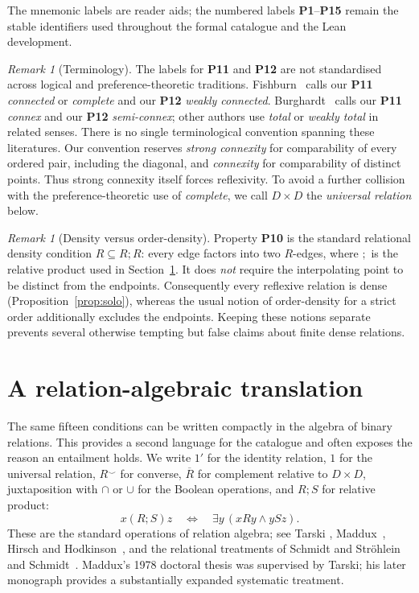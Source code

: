 \documentclass[11pt,a4paper,reqno]{amsart}
\theoremstyle{definition}
\theoremstyle{remark}
\newtheorem{remark}[proposition]{Remark}
\newcommand{\prop}[1]{\textbf{P#1}}
\newcommand{\comp}[1]{\overline{#1}}
\newcommand{\Id}{1'}
\newcommand{\Univ}{1}
\begin{document}
The mnemonic labels are reader aids; the numbered labels \prop{1}--\prop{15}
remain the stable identifiers used throughout the formal catalogue and the
Lean development.

\begin{remark}[Terminology]
The labels for \prop{11} and \prop{12} are not standardised across logical and
preference-theoretic traditions.  Fishburn~\cite[Ch.~1]{Fishburn1970} calls
our \prop{11} \emph{connected} or \emph{complete} and our \prop{12}
\emph{weakly connected}.  Burghardt~\cite{Burghardt2018} calls our \prop{11}
\emph{connex} and our \prop{12} \emph{semi-connex}; other authors use
\emph{total} or \emph{weakly total} in related senses.  There is no single
terminological convention spanning these literatures.  Our convention
reserves \emph{strong connexity} for comparability of every ordered pair,
including the diagonal, and \emph{connexity} for comparability of distinct
points.  Thus strong connexity itself forces reflexivity.  To avoid a further
collision with the preference-theoretic use of \emph{complete}, we call
$D\times D$ the \emph{universal relation} below.
\end{remark}

\begin{remark}[Density versus order-density]\label{rem:density}
Property \prop{10} is the standard relational density condition $R\subseteq
R;R$: every edge factors into two $R$-edges, where $;$ is the relative product
used in Section~\ref{sec:algebra}.  It does \emph{not} require
the interpolating point to be distinct from the endpoints.  Consequently every
reflexive relation is dense (Proposition~\ref{prop:solo}), whereas the usual
notion of order-density for a strict order additionally excludes the endpoints.
Keeping these notions separate prevents several otherwise tempting but false
claims about finite dense relations.
\end{remark}

\section{A relation-algebraic translation}\label{sec:algebra}

The same fifteen conditions can be written compactly in the algebra of binary
relations.  This provides a second language for the catalogue and often exposes
the reason an entailment holds.  We write $\Id$ for the identity relation,
$\Univ$ for the universal relation, $R^\smile$ for converse, $\comp R$ for
complement relative to $D\times D$, juxtaposition with $\cap$ or $\cup$ for the
Boolean operations, and $R;S$ for relative product:
\[
 x(R;S)z \quad\Longleftrightarrow\quad \exists y\,(xRy\wedge ySz).
\]
These are the standard operations of relation algebra; see Tarski
\cite{Tarski1941}, Maddux~\cite{Maddux1978,Maddux}, Hirsch and
Hodkinson~\cite{HirschHodkinson2002}, and the relational treatments of Schmidt
and Str\"ohlein~\cite{SchmidtStroehlein1993} and Schmidt~\cite{Schmidt2010}.
Maddux's 1978 doctoral thesis was supervised by Tarski; his later monograph
provides a substantially expanded systematic treatment.
\end{document}
